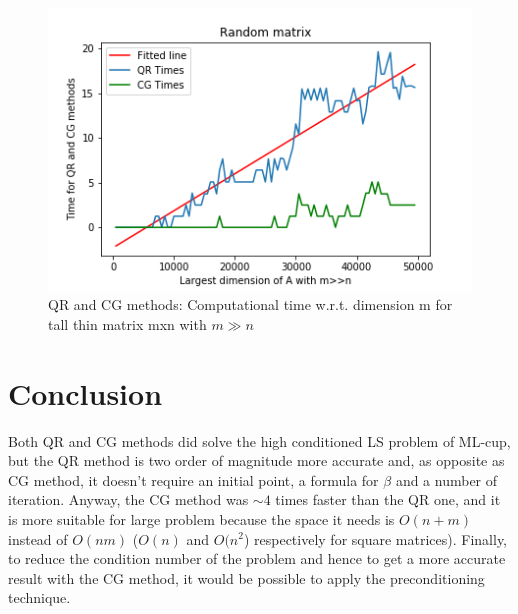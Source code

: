 \documentclass{article}
\begin{document}
        \begin{figure}
            \includegraphics[width=\linewidth]{../results/big_m.png}
            \caption{QR and CG methods: Computational time w.r.t. dimension m for tall thin matrix mxn with $m \gg n$}
            \label{big_m}
        \end{figure}
	


\section{Conclusion}\label{sec:conclusion}
Both QR and CG methods did solve the high conditioned LS problem of ML-cup, but the QR method is two order of magnitude more accurate and, as opposite as CG method, it doesn't require an initial point, a formula for $\beta$ and a number of iteration.
Anyway, the CG method was $\sim 4$ times faster than the QR one, and it is more suitable for large problem because the space it needs is $O(n+m)$ instead of $O(nm)$ ($O(n)$ and $O(n^{2}$) respectively for square matrices). Finally, to reduce the condition number of the problem and hence to get a more accurate result with the CG method, it would be possible to apply the preconditioning technique. 



\end{document}
